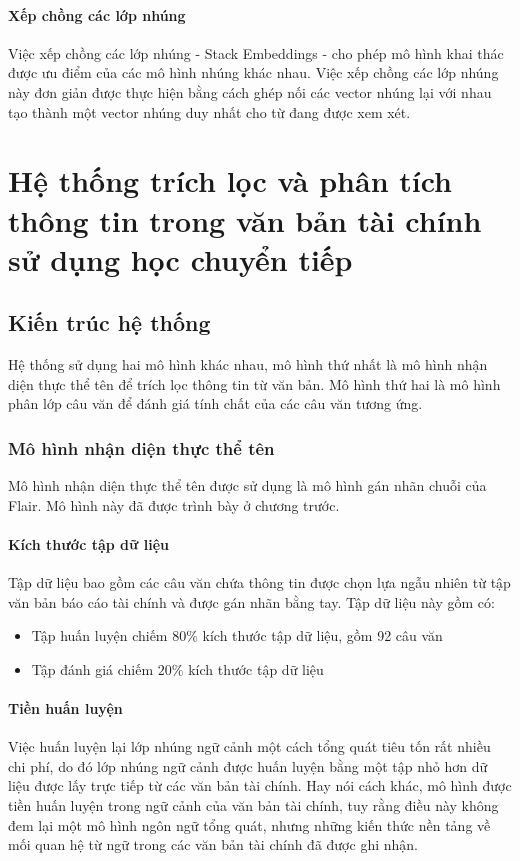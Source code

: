 \documentclass[14pt]{extreport}
\begin{document}
\subsubsection{Xếp chồng các lớp nhúng }
Việc xếp chồng các lớp nhúng -  Stack Embeddings - cho phép mô hình khai thác được ưu điểm của các mô hình nhúng khác nhau. Việc xếp chồng các lớp nhúng này đơn giản được thực hiện bằng cách ghép nối các vector nhúng lại với nhau tạo thành một vector nhúng duy nhất cho từ đang được xem xét.



\chapter{Hệ thống trích lọc và phân tích thông tin trong văn bản tài chính sử dụng học chuyển tiếp}

\section{Kiến trúc hệ thống}
Hệ thống sử dụng hai mô hình khác nhau, mô hình thứ nhất là mô hình nhận diện thực thể tên để trích lọc thông tin từ văn bản. Mô hình thứ hai là mô hình phân lớp câu văn để đánh giá tính chất của các câu văn tương ứng. 

\subsection{Mô hình nhận diện thực thể tên}
Mô hình nhận diện thực thể tên được sử dụng là mô hình gán nhãn chuỗi của Flair. Mô hình này đã được trình bày ở chương trước.
\subsubsection{Kích thước tập dữ liệu}
Tập dữ liệu bao gồm các câu văn chứa thông tin được chọn lựa ngẫu nhiên từ tập văn bản báo cáo tài chính và được gán nhãn bằng tay. Tập dữ liệu này gồm có:
\begin{itemize}
    \item Tập huấn luyện chiếm $80\%$ kích thước tập dữ liệu, gồm 92 câu văn
    \item Tập đánh giá chiếm $20\%$ kích thước tập dữ liệu
\end{itemize}
\subsubsection{Tiền huấn luyện}
Việc huấn luyện lại lớp nhúng ngữ cảnh một cách tổng quát tiêu tốn rất nhiều chi phí, do đó lớp nhúng ngữ cảnh được huấn luyện bằng một tập nhỏ hơn dữ liệu được lấy trực tiếp từ các văn bản tài chính. Hay nói cách khác, mô hình được tiền huấn luyện trong ngữ cảnh của văn bản tài chính, tuy rằng điều này không đem lại một mô hình ngôn ngữ tổng quát, nhưng những kiến thức nền tảng về mối quan hệ từ ngữ trong các văn bản tài chính đã được ghi nhận.
\end{document}
